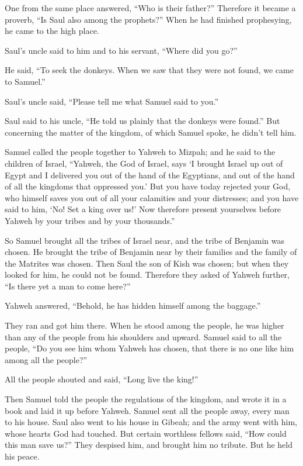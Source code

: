  One from the same place answered, ``Who is their
father?'' Therefore it became a proverb, ``Is Saul also among the
prophets?''  When he had finished prophesying, he came to
the high place.

 Saul's uncle said to him and to his servant, ``Where did
you go?''

He said, ``To seek the donkeys. When we saw that they were not found, we
came to Samuel.''

 Saul's uncle said, ``Please tell me what Samuel said to
you.''

 Saul said to his uncle, ``He told us plainly that the
donkeys were found.'' But concerning the matter of the kingdom, of which
Samuel spoke, he didn't tell him.

 Samuel called the people together to Yahweh to Mizpah;
 and he said to the children of Israel, ``Yahweh, the God
of Israel, says `I brought Israel up out of Egypt and I delivered you
out of the hand of the Egyptians, and out of the hand of all the
kingdoms that oppressed you.'  But you have today
rejected your God, who himself saves you out of all your calamities and
your distresses; and you have said to him, `No! Set a king over us!' Now
therefore present yourselves before Yahweh by your tribes and by your
thousands.''

 So Samuel brought all the tribes of Israel near, and the
tribe of Benjamin was chosen.  He brought the tribe of
Benjamin near by their families and the family of the Matrites was
chosen. Then Saul the son of Kish was chosen; but when they looked for
him, he could not be found.  Therefore they asked of
Yahweh further, ``Is there yet a man to come here?''

Yahweh answered, ``Behold, he has hidden himself among the baggage.''

 They ran and got him there. When he stood among the
people, he was higher than any of the people from his shoulders and
upward.  Samuel said to all the people, ``Do you see him
whom Yahweh has chosen, that there is no one like him among all the
people?''

All the people shouted and said, ``Long live the king!''

 Then Samuel told the people the regulations of the
kingdom, and wrote it in a book and laid it up before Yahweh. Samuel
sent all the people away, every man to his house.  Saul
also went to his house in Gibeah; and the army went with him, whose
hearts God had touched.  But certain worthless fellows
said, ``How could this man save us?'' They despised him, and brought him
no tribute. But he held his peace.

